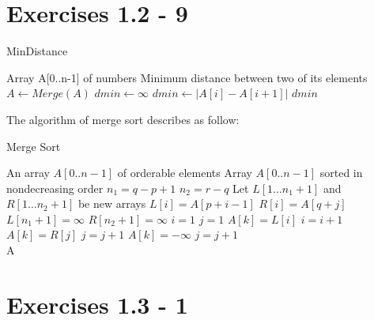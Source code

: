 \documentclass{article}
\begin{document}
\section{Exercises 1.2 - 9}

\begin{algorithm}[H]
 \caption{MinDistance}
   \begin{algorithmic}[1]
     \INPUT Array A[0..n-1] of numbers
     \OUTPUT Minimum distance between two of its elements
     \State $A \leftarrow Merge(A)$
     \State $ dmin \leftarrow \infty$
     \State $dmin \leftarrow |A[i] - A[i+1]|$
     \EndIf
     \EndFor
     \State \Return $dmin$
   \end{algorithmic}
\end{algorithm}

The algorithm of merge sort describes as follow:

\begin{algorithm}[H]
 \caption{Merge Sort}
   \begin{algorithmic}[1]
     \INPUT An array $A[0..n-1]$ of orderable elements
     \OUTPUT Array $A[0..n-1]$ sorted in nondecreasing order
      \State ${n_1} = q - p + 1$
      \State ${n_2} = r - q$
      \State Let $L[1 \ldots {n_1} + 1]$ and $R[1 \ldots {n_2} + 1]$ be new arrays
          \State $L[i] = A[p + i - 1]$
      \EndFor
          \State $R[i] = A[q + j]$
      \EndFor
      \State $L[{n_1} + 1] =  \infty $
      \State $R[{n_2} + 1] =  \infty $
      \State $i = 1$
      \State $j = 1$
              \State $A[k] = L[i]$
              \State $i = i + 1$
              \State $A[k] = R[j]$
              \State $j = j + 1$
          \Else
              \State $A[k] = - \infty$
              \State $j = j + 1$
          \EndIf
      \EndFor
      \EndFunction
      \\
      \Return A
      \EndIf
      \EndFunction

   \end{algorithmic}
\end{algorithm}

\section{Exercises 1.3 - 1}
\end{document}
